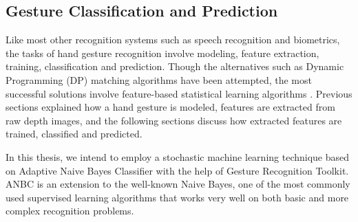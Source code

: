 

\subsection{Gesture Classification and Prediction} Like most other recognition systems such as speech recognition and biometrics, the tasks of hand gesture recognition involve modeling, feature extraction, training, classification and prediction. Though the alternatives such as Dynamic Programming (DP) matching algorithms have been attempted, the most successful solutions involve feature-based statistical learning algorithms \cite{23}. Previous sections explained how a hand gesture is modeled, features are extracted from raw depth images, and the following sections discuss how extracted features are trained, classified and predicted.

In this thesis, we intend to employ a stochastic machine learning technique based on Adaptive Naive Bayes Classifier with the help of Gesture Recognition Toolkit. ANBC is an extension to the well-known Naive Bayes, one of the most commonly used supervised learning algorithms that works very well on both basic and more complex recognition problems.

 
